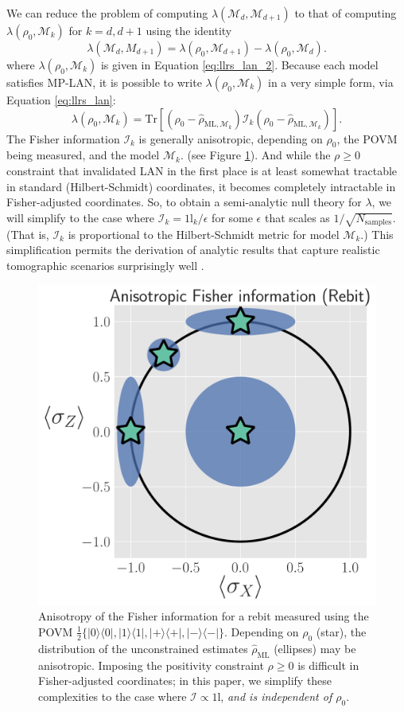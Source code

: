 \documentclass[aps,pra, twocolumn]{revtex4-1}
\newcommand{\M}{\mathcal{M}}
\newcommand{\Id}{\mathbb{I}}
\def\Id{1\!\mathrm{l}}
\newcommand{\rhohat}{\hat{\rho}}
\newcommand{\rhoML}[1]{\rhohat_{\scriptscriptstyle{\mathrm{ML},#1}}}
\begin{document}
We can reduce the problem of computing $\lambda(\M_{d}, \M_{d+1})$ to that of computing $\lambda(\rho_{0}, \M_{k})$ for $k = d, d+1$ using the identity
\[\lambda(\M_{d}, M_{d+1}) = \lambda(\rho_{0}, \M_{d+1}) - \lambda(\rho_{0}, \M_{d}).\]
where $\lambda(\rho_{0}, \M_{k})$ is given in Equation \eqref{eq:llrs_lan_2}.
Because each model satisfies MP-LAN, it is possible to write $\lambda(\rho_{0}, \M_{k})$ in a very simple form, via Equation \eqref{eq:llrs_lan}:
\[\lambda(\rho_{0}, \M_{k}) = \mathrm{Tr}[(\rho_{0} - \rhoML{\M_{k}})\mathcal{I}_{k}(\rho_{0} - \rhoML{\M_{k}})].\]
The Fisher information $\mathcal{I}_{k}$ is generally anisotropic,  depending on $\rho_{0}$, the POVM being measured, and the model $\M_{k}$. (see Figure \ref{fig:anisofi}). And while the $\rho\geq0$ constraint  that invalidated LAN in the first place is at least somewhat tractable in standard (Hilbert-Schmidt) coordinates, it becomes completely intractable in Fisher-adjusted coordinates.  So, to obtain a semi-analytic null theory for $\lambda$, we will simplify to the case where   $\mathcal{I}_{k} = \Id_{k}/\epsilon $ for some $\epsilon$ that scales as $1/\sqrt{N_{\mathrm{samples}}}$. (That is, $\mathcal{I}_{k}$ is proportional to the Hilbert-Schmidt metric for model $\M_{k}$.) This simplification permits the derivation of analytic results that capture realistic tomographic scenarios surprisingly well \cite{Smolin2012}.
\begin{figure}
\includegraphics[width=.85\columnwidth]{Images/Figure_5.pdf}
 \caption{Anisotropy of the Fisher information for a rebit measured using the POVM $\frac{1}{2}\{|0\rangle\langle 0|, |1\rangle\langle 1|, |+\rangle\langle +|, |-\rangle\langle -|\}$. Depending on $\rho_{0}$ (star), the distribution of the unconstrained estimates $\hat{\rho}_{\mathrm{ML}}$ (ellipses) may be anisotropic. Imposing the positivity constraint $\rho \geq 0$ is difficult in Fisher-adjusted coordinates; in this paper, we simplify these complexities to the case where $\mathcal{I} \propto \Id$, \emph{and is independent of $\rho_{0}$}.}
\label{fig:anisofi}
\end{figure}
\end{document}
